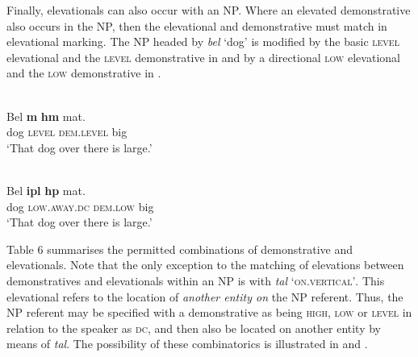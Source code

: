 \documentclass[output=paper]{LSP/langsci}
\begin{document}
Finally, elevationals can also occur with an NP. Where an elevated demonstrative also occurs in the NP, then the elevational and demonstrative must match in elevational marking. The NP headed by \textit{bel} `dog' is modified by the basic \textsc{level} elevational and the \textsc{level} demonstrative in  and by a directional \textsc{low} elevational and the \textsc{low} demonstrative in .  



\ea%
\label{ex:7:26}
 \\
\gll Bel  \textbf{m{\textopeno}{\ng}}  \textbf{h{\textepsilon}m{\textopeno}} mat{\textepsilon}.  \\
  dog  \textsc{level} \textsc{dem.level} big      \\
\glt   `That dog over there is large.'
\z

 
 





\ea%
\label{ex:7:27}
 \\
\gll   Bel  \textbf{ipl{\textepsilon}} \textbf{h{\textepsilon}p{\textopeno}} mat{\textepsilon}. \\
    dog  \textsc{low.away.dc} \textsc{dem.low} big    \\
\glt   `That dog over there is large.'
\z



   



{Table 6 summarises the permitted combinations of demonstrative and elevationals. Note that the only exception to the matching of elevations between demonstratives and elevationals within an NP is with} \textit{tal}\textit{{\textepsilon}} `\textsc{on.vertical'}. This elevational refers to the location of \textit{another entity on} the NP referent. Thus, the NP referent may be specified with a demonstrative as being \textsc{high}, \textsc{low} or \textsc{level} in relation to the speaker as \textsc{dc}, and then also be located on another entity by means of \textit{tal}\textit{{\textepsilon}}. The possibility of these combinatorics is illustrated in  and .

 
\end{document}
